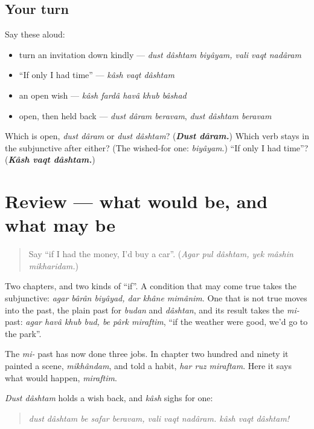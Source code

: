 \subsection*{Your turn}
Say these aloud:

\begin{itemize}
\raggedright
  \item turn an invitation down kindly — \emph{dust dâshtam biyâyam, vali vaqt nadâram}
  \item \textquotedblleft{}If only I had time\textquotedblright{} — \emph{kâsh vaqt dâshtam}
  \item an open wish — \emph{kâsh fardâ havâ khub bâshad}
  \item open, then held back — \emph{dust dâram beravam}, \emph{dust dâshtam beravam}
\end{itemize}

\begin{tcolorbox}[breakable,colback=teal!4,colframe=teal!35!black,title={Before you move on}]
Which is open, \emph{dust dâram} or \emph{dust dâshtam}? (\emph{\textbf{Dust dâram.}}) Which verb stays in the subjunctive after either? (The wished-for one: \emph{biyâyam}.) \textquotedblleft{}If only I had time\textquotedblright{}? (\emph{\textbf{Kâsh vaqt dâshtam.}})
\end{tcolorbox}
\section[(review)]{Review — what would be, and what may be}

\label{lesson:FA-R299-would-and-if-only}



\begin{quote}
Say \textquotedblleft{}if I had the money, I'd buy a car\textquotedblright{}. (\emph{Agar pul dâshtam, yek mâshin mikharidam.})
\end{quote}

\begin{grammarlens}[title={What you've built}]
Two chapters, and two kinds of \textquotedblleft{}if\textquotedblright{}. A condition that may come true takes the subjunctive: \emph{agar bârân biyâyad, dar khâne mimânim}. One that is not true moves into the past, the plain past for \emph{budan} and \emph{dâshtan}, and its result takes the \emph{mi-} past: \emph{agar havâ khub bud, be pârk miraftim}, \textquotedblleft{}if the weather were good, we'd go to the park\textquotedblright{}.

The \emph{mi-} past has now done three jobs. In chapter two hundred and ninety it painted a scene, \emph{mikhândam}, and told a habit, \emph{har ruz miraftam}. Here it says what would happen, \emph{miraftim}.

\emph{Dust dâshtam} holds a wish back, and \emph{kâsh} sighs for one:

\begin{quote}
\emph{dust dâshtam be safar beravam, vali vaqt nadâram. kâsh vaqt dâshtam!}
\end{quote}
\end{grammarlens}

